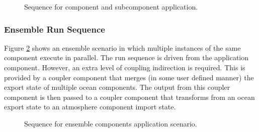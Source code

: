 \begin{figure}
\caption[{Subcomponent Run}]{Sequence for component and subcomponent
application.\\}
\begin{center}
\label{fig:SubcomponentRunSequence}
\end{center}
\end{figure}

\subsubsection{Ensemble Run Sequence}
Figure \ref{fig:EnsembleComponentsRunSequence} shows an ensemble scenario
in which multiple instances of the same component execute in parallel.
The run sequence is driven from the application component. However,
an extra level of coupling indirection is required. This is provided by a
coupler component that merges (in some user defined manner) the export
state of multiple ocean components. The output from this coupler
component is then passed to a coupler component that transforms from an
ocean export state to an
atmosphere component import state.
\begin{figure}
\caption[{Ensemble component Run}]{Sequence for ensemble components
application scenario.\\}
\begin{center}
\label{fig:EnsembleComponentsRunSequence}
\end{center}
\end{figure}

